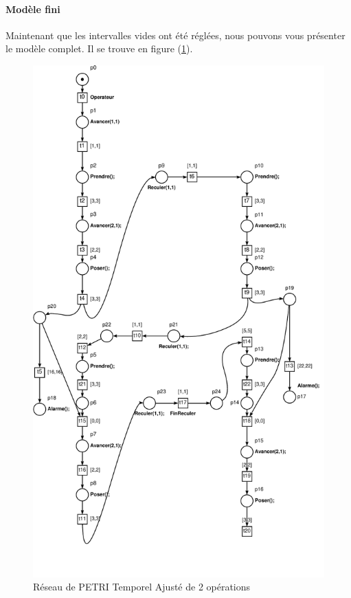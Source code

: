 \paragraph*{Modèle fini} Maintenant que les intervalles vides ont été réglées, nous pouvons vous présenter le modèle complet. Il se trouve en figure (\ref{fig:RdpAjusteeIII-2}).

\begin{figure}[!ht]
\centering
\includegraphics[height = \textheight]{./II/images/reseau-AjustementIII-2.pdf}
\caption{Réseau de PETRI Temporel Ajusté de 2 opérations\label{fig:RdpAjusteeIII-2}}
\end{figure}

